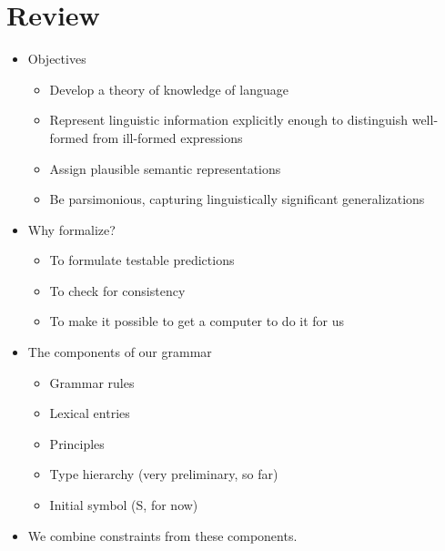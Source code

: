 \documentclass[a4paper,landscape,headrule,footrule]{foils}
\begin{document}
\maketitle


\overview
{}



\section[Review: what we are trying to do; last week's semantics]{Review}

\begin{itemize}
\item Objectives
\begin{itemize}
\item Develop a theory of knowledge of language
\item Represent linguistic information explicitly enough to
distinguish well-formed from ill-formed expressions
\item Assign plausible semantic representations
\item Be parsimonious, capturing linguistically significant
generalizations
\end{itemize}
\item Why formalize?
\begin{itemize}
\item To formulate testable predictions
\item To check for consistency
\item To make it possible to get a computer to do it for us
\end{itemize}
\end{itemize}

\begin{itemize}
\item The components of our grammar
\begin{itemize}
\item Grammar rules
\item Lexical entries
\item Principles
\item Type hierarchy (very preliminary, so far)
\item Initial symbol (S, for now) \\[2ex]
  \begin{small}
\end{small}   

\end{itemize}
\item We combine constraints from these components.
\end{itemize}
\end{document}
